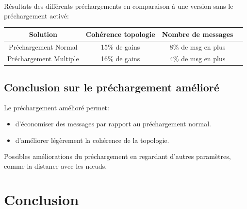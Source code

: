 \documentclass{beamer}
\begin{document}
  \begin{frame}
	 Résultats des différents préchargements en comparaison à une version sans le préchargement activé:
        \begin{table}[!h]
                \begin{center}
                \begin{tabular}{|c|c|c|c|}
                \hline
                Solution & Cohérence topologie & Nombre de messages \\
                \hline
                Préchargement Normal & 15\% de gains &  8\% de msg en plus\\
                Préchargement Multiple & 16\% de gains &  4\% de msg en plus\\
                \hline
                \end{tabular}
                \end{center}
                \label{tab:config1}
        \end{table}
  \end{frame}

  \subsection{Conclusion sur le préchargement amélioré}
  \begin{frame}
	Le préchargement amélioré permet:
	\begin{itemize}
		\item d'économiser des messages par rapport au préchargement normal.\\
		\item d'améliorer légèrement la cohérence de la topologie.\\
	\end{itemize}
	\vspace{5mm}
	Possibles améliorations du préchargement en regardant d'autres paramètres, comme la distance avec les nœuds.
  \end{frame}
	
  
  \section{Conclusion}
  \begin{frame}
  \end{frame}
  
  
\end{document}
